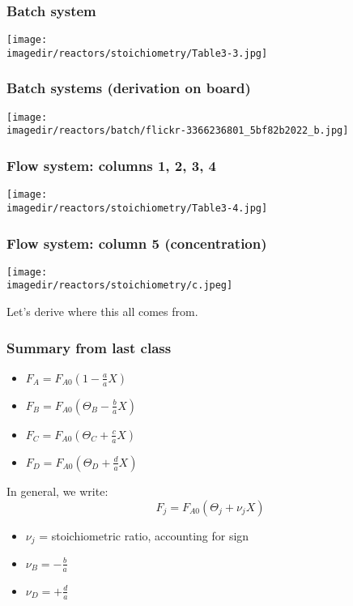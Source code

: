 \begin{frame}\frametitle{Batch system}
	\begin{center}
		\texttt{[image: \\imagedir/reactors/stoichiometry/Table3-3.jpg]}
	\end{center}
\end{frame}

\begin{frame}\frametitle{Batch systems (derivation on board)}
	\begin{center}
		\texttt{[image: \\imagedir/reactors/batch/flickr-3366236801\_5bf82b2022\_b.jpg]}
	\end{center}
\end{frame}

\begin{frame}\frametitle{Flow system: columns 1, 2, 3, 4}
	\begin{center}
		\texttt{[image: \\imagedir/reactors/stoichiometry/Table3-4.jpg]}
	\end{center}
\end{frame}

\begin{frame}\frametitle{Flow system: column 5 (concentration)}
	\begin{center}
		\texttt{[image: \\imagedir/reactors/stoichiometry/c.jpeg]}
	\end{center}
	Let's derive where this all comes from.
\end{frame}

\begin{frame}\frametitle{Summary from last class}
	\begin{itemize}
		\item	$F_A = F_{A0}\left(1-\frac{a}{a}X\right)$
		\item	$F_B = F_{A0}\left(\Theta_B-\frac{b}{a}X\right)$
		\item	$F_C = F_{A0}\left(\Theta_C+\frac{c}{a}X\right)$
		\item	$F_D = F_{A0}\left(\Theta_D+\frac{d}{a}X\right)$
	\end{itemize}
	\begin{exampleblock}{In general, we write:}
		$$F_j = F_{A0}\left(\Theta_j+\nu_j X\right)$$
	\end{exampleblock}
	\begin{itemize}
		\item	$\nu_j$ = stoichiometric ratio, accounting for sign
		\item	$\nu_B = -\frac{b}{a}$
		\item	$\nu_D = +\frac{d}{a}$
	\end{itemize}
\end{frame}


